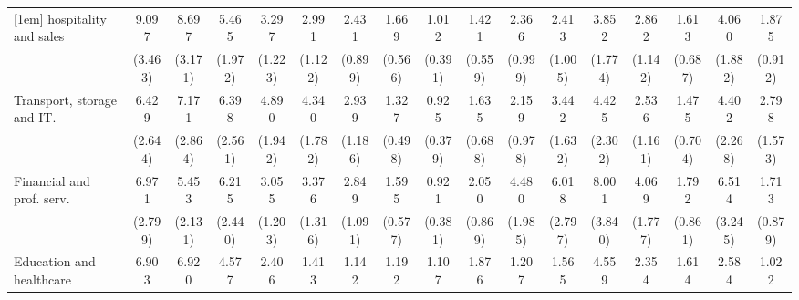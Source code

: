{\begin{tabular}{l*{16}{c}}
[1em]
hospitality and sales&       9.097\sym{***}&       8.697\sym{***}&       5.465\sym{***}&       3.297\sym{**} &       2.991\sym{**} &       2.431\sym{*}  &       1.669         &       1.012         &       1.421         &       2.366\sym{*}  &       2.413\sym{*}  &       3.852\sym{**} &       2.862\sym{**} &       1.613         &       4.060\sym{**} &       1.875         \\
                    &     (3.463)         &     (3.171)         &     (1.972)         &     (1.223)         &     (1.122)         &     (0.899)         &     (0.566)         &     (0.391)         &     (0.559)         &     (0.999)         &     (1.005)         &     (1.774)         &     (1.142)         &     (0.687)         &     (1.882)         &     (0.912)         \\
[1em]
Transport, storage and IT.&       6.429\sym{***}&       7.171\sym{***}&       6.398\sym{***}&       4.890\sym{***}&       4.340\sym{***}&       2.939\sym{**} &       1.327         &       0.925         &       1.635         &       2.159         &       3.442\sym{**} &       4.425\sym{**} &       2.536\sym{*}  &       1.475         &       4.402\sym{**} &       2.798         \\
                    &     (2.644)         &     (2.864)         &     (2.561)         &     (1.942)         &     (1.782)         &     (1.186)         &     (0.498)         &     (0.379)         &     (0.688)         &     (0.978)         &     (1.632)         &     (2.302)         &     (1.161)         &     (0.704)         &     (2.268)         &     (1.573)         \\
[1em]
Financial and prof. serv.&       6.971\sym{***}&       5.453\sym{***}&       6.215\sym{***}&       3.055\sym{**} &       3.376\sym{**} &       2.849\sym{**} &       1.595         &       0.921         &       2.050         &       4.480\sym{***}&       6.018\sym{***}&       8.001\sym{***}&       4.069\sym{**} &       1.792         &       6.514\sym{***}&       1.713         \\
                    &     (2.799)         &     (2.131)         &     (2.440)         &     (1.203)         &     (1.316)         &     (1.091)         &     (0.577)         &     (0.381)         &     (0.869)         &     (1.985)         &     (2.797)         &     (3.840)         &     (1.777)         &     (0.861)         &     (3.245)         &     (0.879)         \\
[1em]
Education and healthcare&       6.903\sym{***}&       6.920\sym{***}&       4.577\sym{**} &       2.406         &       1.413         &       1.142         &       1.192         &       1.107         &       1.876         &       1.207         &       1.565         &       4.559\sym{*}  &       2.354         &       1.614         &       2.584         &       1.022         \\

\end{tabular}}
